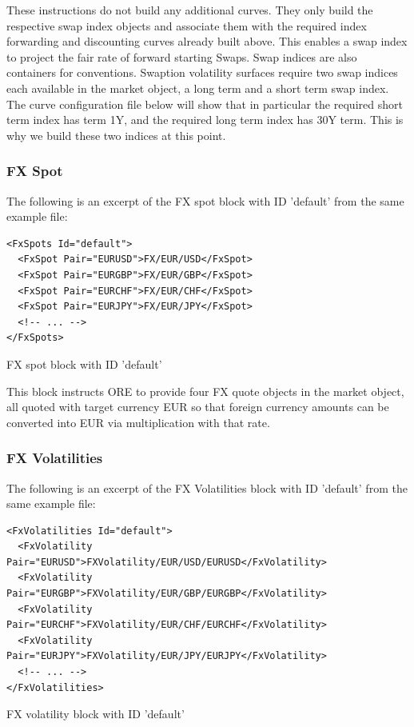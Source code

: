 \documentclass[12pt, a4paper]{article}
\begin{document}
These instructions do not build any additional curves. They only build the respective swap index objects and associate
them with the required index forwarding and discounting curves already built above. This enables a swap index to project
the fair rate of forward starting Swaps. Swap indices are also containers for conventions. Swaption volatility surfaces
require two swap indices each available in the market object, a long term and a short term swap index. The curve
configuration file below will show that in particular the required short term index has term 1Y, and the required long
term index has 30Y term. This is why we build these two indices at this point.

\subsubsection{FX Spot}

The following is an excerpt of the FX spot block with ID 'default' from the same example file:

\begin{listing}[H]
\begin{verbatim}
<FxSpots Id="default">
  <FxSpot Pair="EURUSD">FX/EUR/USD</FxSpot>
  <FxSpot Pair="EURGBP">FX/EUR/GBP</FxSpot>
  <FxSpot Pair="EURCHF">FX/EUR/CHF</FxSpot>
  <FxSpot Pair="EURJPY">FX/EUR/JPY</FxSpot>
  <!-- ... -->
</FxSpots>
\end{verbatim}
\caption{FX spot block with ID 'default'}
\label{lst:fxspot_spec}
\end{listing}

This block instructs ORE to provide four FX quote objects in the market object, all quoted with target currency EUR so
that foreign currency amounts can be converted into EUR via multiplication with that rate.
 
\subsubsection{FX Volatilities}

The following is an excerpt of the FX Volatilities block with ID 'default' from the same example file:

\begin{listing}[H]
\begin{verbatim}
<FxVolatilities Id="default">
  <FxVolatility Pair="EURUSD">FXVolatility/EUR/USD/EURUSD</FxVolatility>
  <FxVolatility Pair="EURGBP">FXVolatility/EUR/GBP/EURGBP</FxVolatility>
  <FxVolatility Pair="EURCHF">FXVolatility/EUR/CHF/EURCHF</FxVolatility>
  <FxVolatility Pair="EURJPY">FXVolatility/EUR/JPY/EURJPY</FxVolatility>
  <!-- ... -->
</FxVolatilities>
\end{verbatim}
\caption{FX volatility block with ID 'default'}
\label{lst:fxvol_spec}
\end{listing}
\end{document}
